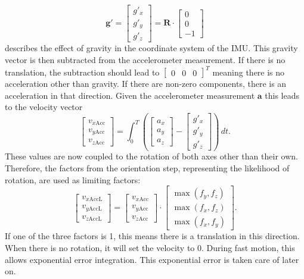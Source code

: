 \documentclass[letterpaper, 10 pt, conference]{ieeeconf}  %
\newcommand{\M}[1]{\mathbf{#1}} %
\newcommand{\V}[1]{\mathbf{#1}} %
\begin{document}
\begin{equation}
\V g\V '=\begin{bmatrix}
g'_x\\
g'_y\\
g'_z
\end{bmatrix}
= \M R \cdot \begin{bmatrix}
0 \\0  \\ - 1
\end{bmatrix}
\end{equation}
describes the effect of gravity in the coordinate system of the IMU.
This gravity vector is then subtracted from the accelerometer measurement. If there is no translation, the subtraction should lead to $\begin{bmatrix}
0 & 0&0
\end{bmatrix}^T$ meaning there is no acceleration other than gravity. If there are non-zero components, there is an acceleration in that direction. Given the accelerometer measurement $\V a$ this leads to the velocity vector
\begin{equation}
\begin{bmatrix}
v_{x\text{Acc}} \\ v_{y\text{Acc}} \\v_{z\text{Acc}} 
\end{bmatrix}
= 
\int_0^T \left(\begin{bmatrix}
a_x \\ a_y \\ a_z
\end{bmatrix} 
-  \begin{bmatrix}
g'_x\\
g'_y\\
g'_z
\end{bmatrix} \right)\, dt.
\end{equation}
These values are now coupled to the rotation of both axes other than their own.
Therefore, the factors from the orientation step, representing the likelihood of rotation, are used as limiting factors:
\begin{equation}
\begin{bmatrix}
v_{x\text{AccL}} \\ v_{y\text{AccL}} \\v_{z\text{AccL}} 
\end{bmatrix}
 = \begin{bmatrix}
v_{x\text{Acc}} \\ v_{y\text{Acc}} \\v_{z\text{Acc}} 
\end{bmatrix}  \cdot 
\begin{bmatrix}
\max(f_y, f_z) \\ \max(f_x, f_z) \\ \max(f_x, f_y) 
\end{bmatrix}.
\end{equation}
If one of the three factors is 1, this means there is a translation in this direction.
When there is no rotation, it will set the velocity to 0.
During fast motion, this allows exponential error integration. 
This exponential error is taken care of later on.
\end{document}
